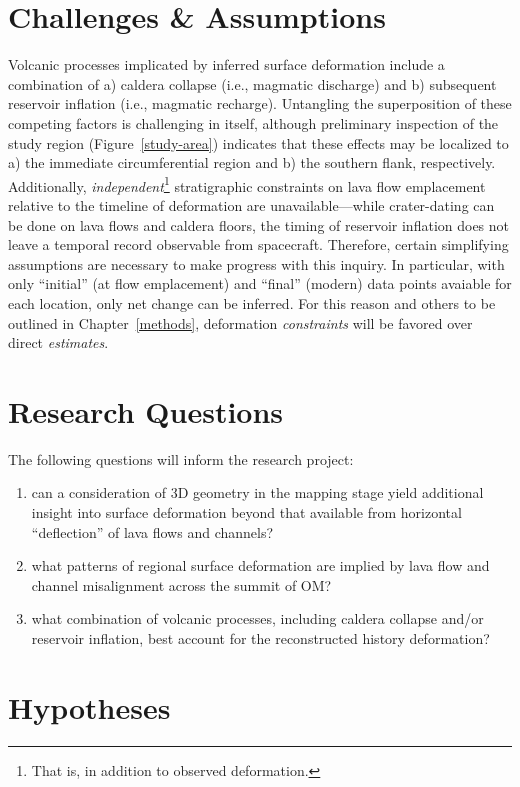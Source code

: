 \section{Challenges \& Assumptions}
Volcanic processes implicated by inferred surface deformation include a combination of a) caldera collapse (i.e., magmatic discharge) and b) subsequent reservoir inflation (i.e., magmatic recharge). Untangling the superposition of these competing factors is challenging in itself, although preliminary inspection of the study region (Figure~\ref{study-area}) indicates that these effects may be localized to a) the immediate circumferential region and b) the southern flank, respectively. Additionally, \textit{independent}\footnote{That is, in addition to observed deformation.} stratigraphic constraints on lava flow emplacement relative to the timeline of deformation are unavailable---while crater-dating can be done on lava flows and caldera floors, the timing of reservoir inflation does not leave a temporal record observable from spacecraft. Therefore, certain simplifying assumptions are necessary to make progress with this inquiry. In particular, with only ``initial'' (at flow emplacement) and ``final'' (modern) data points avaiable for each location, only net change can be inferred. For this reason and others to be outlined in Chapter~\ref{methods}, deformation \textit{constraints} will be favored over direct \textit{estimates}.

\section{Research Questions}

The following questions will inform the research project:  \begin{enumerate}
    \item can a consideration of 3D geometry in the mapping stage yield additional insight into surface deformation beyond that available from horizontal ``deflection'' of lava flows and channels?
    \item what patterns of regional surface deformation are implied by lava flow and channel misalignment across the summit of \ac{OM}?
    \item what combination of volcanic processes, including caldera collapse and/or reservoir inflation, best account for the reconstructed history deformation?
\end{enumerate}

\section{Hypotheses}


